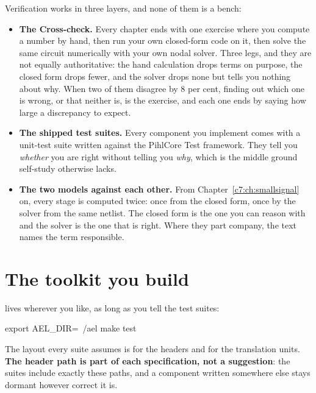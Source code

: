Verification works in three layers, and none of them is a bench:
\begin{itemize}
  \item \textbf{The Cross-check.} Every chapter ends with one exercise where you compute a number
    by hand, then run your own closed-form code on it, then solve the same circuit numerically
    with your own nodal solver. Three legs, and they are not equally authoritative: the hand
    calculation drops terms on purpose, the closed form drops fewer, and the solver drops none but
    tells you nothing about why. When two of them disagree by 8 per cent, finding out which one is
    wrong, or that neither is, is the exercise, and each one ends by saying how large a
    discrepancy to expect.
  \item \textbf{The shipped test suites.} Every component you implement comes with a unit-test
    suite written against the PihlCore Test framework. They tell you \emph{whether} you are right
    without telling you \emph{why}, which is the middle ground self-study otherwise lacks.
  \item \textbf{The two models against each other.} From Chapter~\ref{c7:ch:smallsignal} on, every
    stage is computed twice: once from the closed form, once by the solver from the same netlist.
    The closed form is the one you can reason with and the solver is the one that is right. Where
    they part company, the text names the term responsible.
\end{itemize}

\section*{The toolkit you build}
\label{pre:sec:toolkit}
 lives wherever you like, as long as you tell the test suites:

\begin{shell}
export AEL_DIR=~/ael
make test
\end{shell}

\noindent The layout every suite assumes is  for the headers and
 for the translation units. \textbf{The header path is part of each
specification, not a suggestion}: the suites include exactly these paths, and a component written
somewhere else stays dormant however correct it is.

